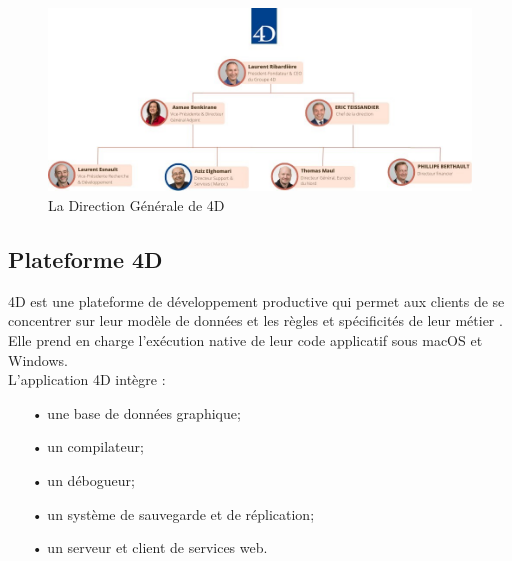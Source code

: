 \begin{figure}[h]
    \centering
    \includegraphics[scale=0.35]{Images/direction.jpg} %
    \caption{La Direction Générale de 4D\cite{4d}}
    \label{fig:direction}
\end{figure}

\subsection{Plateforme 4D}
4D est une plateforme de développement productive qui permet aux clients de se concentrer 
sur leur modèle de données et les règles et spécificités de leur métier \cite{4d}. 
Elle prend en charge l’exécution native de leur code applicatif sous macOS et Windows. 
\\
L'application 4D intègre :
\begin{spacing}{1.2}
    \begin{itemize}
        \item[•] une base de données graphique;
        \item[•] un compilateur;
        \item[•] un débogueur;
        \item[•] un système de sauvegarde et de réplication;
        \item[•] un serveur et client de services web.\\
    \end{itemize}    
\end{spacing}


